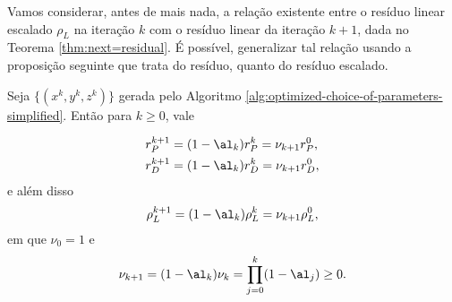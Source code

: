 


Vamos considerar, antes de mais nada, a relação existente entre o resíduo linear escalado $\rho_L$ na iteração $k$ com o resíduo 
linear da iteração $k+1$, dada no Teorema \ref{thm:next=residual}. É possível, generalizar tal relação usando a  proposição seguinte que trata do resíduo, quanto do resíduo escalado. 
\begin{prop}\label{prop:nu_k}
 Seja $\{(x^k,y^k,z^k)\}$ gerada pelo Algoritmo \ref{alg:optimized-choice-of-parameters-simplified}. Então para $k\geq0$, vale  

\begin{equation}
\label{eq:residual-norm-relation-nonscaled}
\begin{aligned}
 r_P^{k+1}  & = (1-\al_k) r_P^{k} = \nu_{k+1}  r_P^{0}, \\
  r_D^{k+1}  & = (1-\al_k) r_D^{k} = \nu_{k+1}  r_D^{0}, \\
\end{aligned}
\end{equation}
e além disso
\begin{equation}
\label{eq:residual-norm-relation}
 \rho_L^{k+1}  = (1-\al_k) \rho_L^{k} = \nu_{k+1}  \rho_L^{0},
\end{equation}
em que  $\nu_0 = 1$ e 
\begin{equation}
	\label{eq:nu_k+1}
\nu_{k+1} = (1-\al_k)\nu_k = \prod_{j=0}^{k}(1-\al_j) \geq 0.
\end{equation}
\end{prop}

